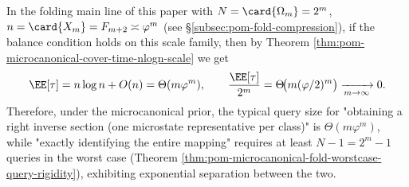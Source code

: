 \begin{corollary}\label{cor:pom-microcanonical-cover-time-fibonacci-separation}
In the folding main line of this paper with \(N=\card{\Omega_m}=2^m\), \(n=\card{X_m}=F_{m+2}\asymp\varphi^m\) (see \S\ref{subsec:pom-fold-compression}),
if the balance condition holds on this scale family, then by Theorem \ref{thm:pom-microcanonical-cover-time-nlogn-scale} we get
\[
\EE[\tau]=n\log n+O(n)=\Theta(m\varphi^m),
\qquad
\frac{\EE[\tau]}{2^m}=\Theta\!\bigl(m(\varphi/2)^m\bigr)\xrightarrow[m\to\infty]{}0.
\]
Therefore, under the microcanonical prior, the typical query size for "obtaining a right inverse section (one microstate representative per class)" is \(\Theta(m\varphi^m)\),
while "exactly identifying the entire mapping" requires at least \(N-1=2^m-1\) queries in the worst case (Theorem \ref{thm:pom-microcanonical-fold-worstcase-query-rigidity}), exhibiting exponential separation between the two.
\end{corollary}

